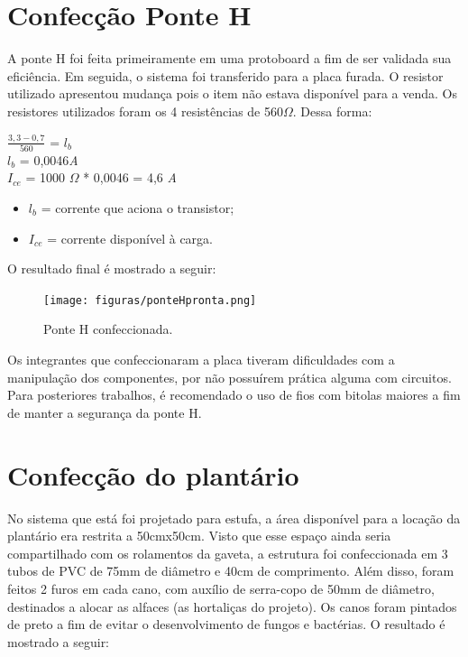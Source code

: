 \section{Confecção Ponte H}
A ponte H foi feita primeiramente em uma protoboard a fim de ser validada sua eficiência. Em seguida, o sistema foi transferido para a placa furada. O resistor utilizado apresentou mudança pois o item não estava disponível para a venda. Os resistores utilizados foram os 4 resistências de 560$\Omega$. Dessa forma:  

\begin{center}
	
	$\frac{3,3 - 0,7}{560}$ = $l_{b}$\\
	$l_{b}$ = 0,0046\textit{A}\\
	$I_{ce}$ = 1000 $\Omega$ * 0,0046 = 4,6 \textit{A}
	
\end{center}

\begin{itemize}

	\item $l_{b}$ = corrente que aciona o transistor;
	\item $I_{ce}$ = corrente disponível à carga.
	
\end{itemize}

O resultado final é mostrado a seguir:

\begin{figure}[H]
	\centering
	\texttt{[image: figuras/ponteHpronta.png]}
	\caption{Ponte H confeccionada.}
	\label{ponte H pronta}
\end{figure}

Os integrantes que confeccionaram a placa tiveram dificuldades com a manipulação dos componentes, por não possuírem prática alguma com circuitos. Para posteriores trabalhos, é recomendado o uso de fios com bitolas maiores a fim de manter a segurança da ponte H.

\section{Confecção do plantário}

No sistema que está foi projetado para estufa, a área disponível para a locação da plantário era restrita a 50cmx50cm. Visto que esse espaço ainda seria compartilhado com os rolamentos da gaveta, a estrutura foi confeccionada em 3 tubos de PVC de 75mm de diâmetro e 40cm de comprimento. Além disso, foram feitos 2 furos em cada cano, com auxílio de serra-copo de 50mm de diâmetro, destinados a alocar as alfaces (as hortaliças do projeto). Os canos foram pintados de preto a fim de evitar o desenvolvimento de fungos e bactérias. O resultado é mostrado a seguir:


